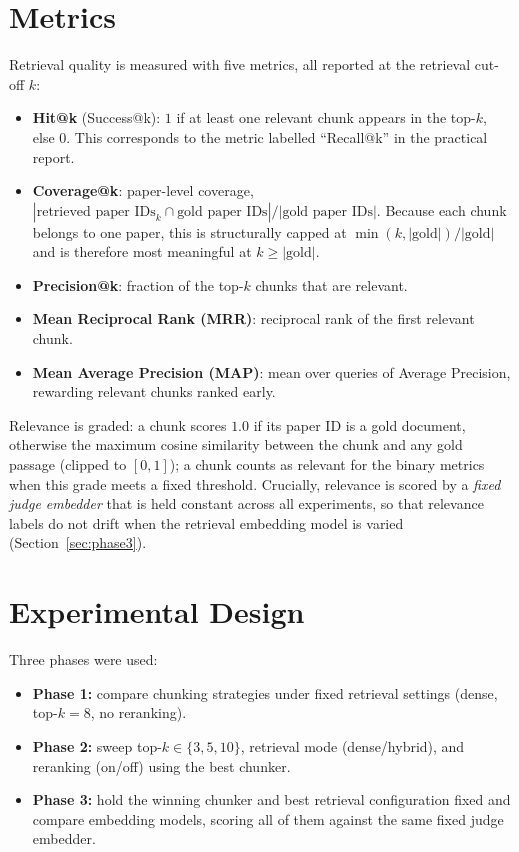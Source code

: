 \documentclass[12pt,a4paper,titlepage,oneside]{book}
\begin{document}
\section{Metrics}
Retrieval quality is measured with five metrics, all reported at the retrieval cut-off $k$:
\begin{itemize}
    \item \textbf{Hit@k} (Success@k): $1$ if at least one relevant chunk appears in the top-$k$, else $0$. This corresponds to the metric labelled ``Recall@k'' in the practical report.
    \item \textbf{Coverage@k}: paper-level coverage, $|\text{retrieved paper IDs}_k \cap \text{gold paper IDs}| / |\text{gold paper IDs}|$. Because each chunk belongs to one paper, this is structurally capped at $\min(k,|\text{gold}|)/|\text{gold}|$ and is therefore most meaningful at $k \geq |\text{gold}|$.
    \item \textbf{Precision@k}: fraction of the top-$k$ chunks that are relevant.
    \item \textbf{Mean Reciprocal Rank (MRR)}: reciprocal rank of the first relevant chunk.
    \item \textbf{Mean Average Precision (MAP)}: mean over queries of Average Precision, rewarding relevant chunks ranked early.
\end{itemize}

Relevance is graded: a chunk scores $1.0$ if its paper ID is a gold document, otherwise the maximum cosine similarity between the chunk and any gold passage (clipped to $[0,1]$); a chunk counts as relevant for the binary metrics when this grade meets a fixed threshold. Crucially, relevance is scored by a \emph{fixed judge embedder} that is held constant across all experiments, so that relevance labels do not drift when the retrieval embedding model is varied (Section~\ref{sec:phase3}).

\section{Experimental Design}
Three phases were used:
\begin{itemize}
    \item \textbf{Phase 1:} compare chunking strategies under fixed retrieval settings (dense, top-$k=8$, no reranking).
    \item \textbf{Phase 2:} sweep top-$k \in \{3,5,10\}$, retrieval mode (dense/hybrid), and reranking (on/off) using the best chunker.
    \item \textbf{Phase 3:} hold the winning chunker and best retrieval configuration fixed and compare embedding models, scoring all of them against the same fixed judge embedder.
\end{itemize}
\end{document}
